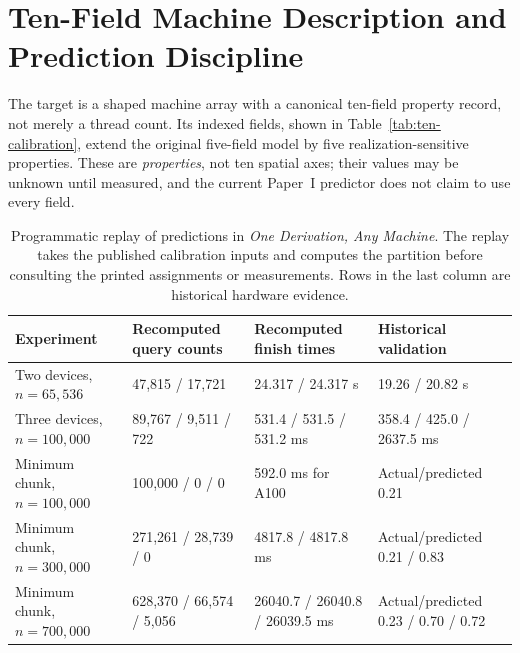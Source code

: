 \documentclass[sigplan,10pt,review,anonymous,balance=false,pbalance=false]{acmart}
\begin{document}
\section{Ten-Field Machine Description and Prediction Discipline}
The target is a shaped machine array with a canonical ten-field property record, not merely a thread count. Its indexed fields, shown in Table~\ref{tab:ten-calibration}, extend the original five-field model by five realization-sensitive properties. These are \emph{properties}, not ten spatial axes; their values may be unknown until measured, and the current Paper~I predictor does not claim to use every field.

\begin{table}[tp]
\centering\footnotesize
\caption{Programmatic replay of predictions in \emph{One Derivation, Any Machine}. The replay takes the published calibration inputs and computes the partition before consulting the printed assignments or measurements. Rows in the last column are historical hardware evidence.}\label{tab:prediction-validation}
\begin{tabular}{@{}p{}p{}p{}p{}@{}}\toprule
Experiment & Recomputed query counts & Recomputed finish times & Historical validation \\\midrule
Two devices, $n=65{,}536$ & 47,815 / 17,721 & 24.317 / 24.317 s & 19.26 / 20.82 s \\
Three devices, $n=100{,}000$ & 89,767 / 9,511 / 722 & 531.4 / 531.5 / 531.2 ms & 358.4 / 425.0 / 2637.5 ms \\
Minimum chunk, $n=100{,}000$ & 100,000 / 0 / 0 & 592.0 ms for A100 & Actual/predicted 0.21 \\
Minimum chunk, $n=300{,}000$ & 271,261 / 28,739 / 0 & 4817.8 / 4817.8 ms & Actual/predicted 0.21 / 0.83 \\
Minimum chunk, $n=700{,}000$ & 628,370 / 66,574 / 5,056 & 26040.7 / 26040.8 / 26039.5 ms & Actual/predicted 0.23 / 0.70 / 0.72 \\
\bottomrule\end{tabular}
\end{table}
\end{document}
